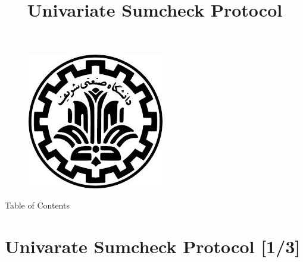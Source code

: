 \documentclass{beamer}
\title{
Univariate Sumcheck Protocol
}
\date{}
\newcommand{\npso}{\text{PSO}}
\newcommand{\nmadjoin}{\text{M-Adjoin}}
\begin{document}
\begin{frame}
\begin{figure}[h]
\centering
\includegraphics[scale=0.2]{logo}
\end{figure}

  \titlepage
\end{frame}

\begin{frame}{Table of Contents}

{\footnotesize{}
\begin{multicols}{2}
\tableofcontents
\end{multicols}	
}	
\end{frame}



\section{Univarate Sumcheck Protocol [1/3]}
\end{document}

